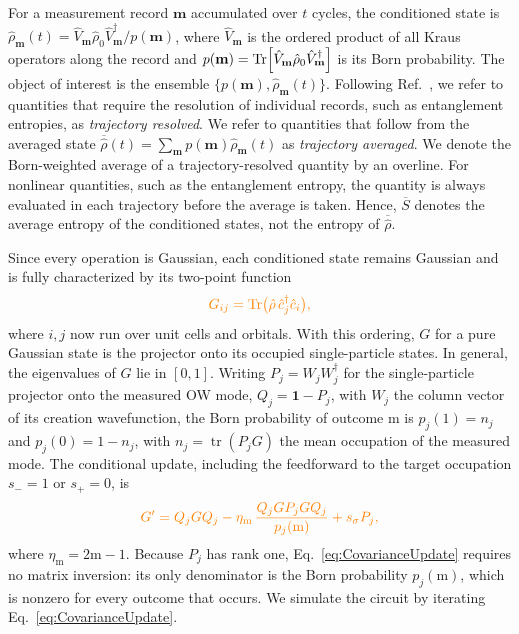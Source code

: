 \documentclass[aps,prb,10pt,twocolumn,superscriptaddress,longbibliography,floatfix]{revtex4-2}
\newcommand{\Id}{\mathbf{1}}
\newcommand{\rec}{\mathbf m}   %
\newcommand{\newtext}[1]{{\color{blue}#1}}
\newcommand{\claudeadd}[1]{{\color{orange}#1}}
\begin{document}
For a measurement record $\rec$ accumulated over $t$ cycles, the conditioned state is $\hat\rho_{\rec}(t)=\hat V_{\rec}\hat\rho_0\hat V_{\rec}^\dagger/p(\rec)$, where $\hat V_{\rec}$ is the ordered product of all Kraus operators along the record and $p(\rec)=\Tr[\hat V_{\rec}\hat\rho_0\hat V_{\rec}^\dagger]$ is its Born probability. The object of interest is the ensemble $\{p(\rec),\hat\rho_{\rec}(t)\}$. Following Ref.~\cite{BhuiyanPanJian2026}, we refer to quantities that require the resolution of individual records, such as entanglement entropies, as \emph{trajectory resolved}. We refer to quantities that follow from the averaged state $\overline{\hat\rho}(t)=\sum_{\rec}p(\rec)\hat\rho_{\rec}(t)$ as \emph{trajectory averaged}. We denote the Born-weighted average of a trajectory-resolved quantity by an overline. For nonlinear quantities, such as the entanglement entropy, the quantity is always evaluated in each trajectory before the average is taken. Hence, $\overline{S}$ denotes the average entropy of the conditioned states, not the entropy of $\overline{\hat\rho}$.

Since every operation is Gaussian, each conditioned state remains Gaussian and is fully characterized by its two-point function
\begin{equation}
    \claudeadd{G_{ij}=\Tr\!\big(\hat\rho\,\hat c_j^\dagger\hat c_i\big),}
    \label{eq:TwoPoint}
\end{equation}
where $i,j$ now run over unit cells and orbitals. With this ordering, \claudeadd{$G$} for a pure Gaussian state is the projector onto its occupied single-particle states. In general, \newtext{the eigenvalues of $G$} lie in $[0,1]$. Writing \claudeadd{$P_j=W_jW_j^\dagger$} for the single-particle projector onto the measured OW mode, $Q_j=\Id-P_j$, \newtext{with $W_j$ the column vector of its creation wavefunction,} the Born probability of outcome $\mathrm m$ is \claudeadd{$p_j(1)=n_j$ and $p_j(0)=1-n_j$, with $n_j=\operatorname{tr}(P_jG)$ the mean occupation of the measured mode}. The conditional update, including the feedforward to the target occupation $s_-=1$ or $s_+=0$, is~\cite{bravyi2004lagrangian,BhuiyanPanJian2026}
\begin{equation}
    \claudeadd{G'=Q_jGQ_j-\eta_{\mathrm m}\,\frac{Q_jGP_jGQ_j}{p_j(\mathrm m)}+s_\sigma P_j,}
    \label{eq:CovarianceUpdate}
\end{equation}
\claudeadd{where $\eta_{\mathrm m}=2\mathrm m-1$. Because $P_j$ has rank one, Eq.~\eqref{eq:CovarianceUpdate} requires no matrix inversion: its only denominator is the Born probability $p_j(\mathrm m)$, which is nonzero for every outcome that occurs.} We simulate the circuit by iterating Eq.~\eqref{eq:CovarianceUpdate}.
\end{document}
